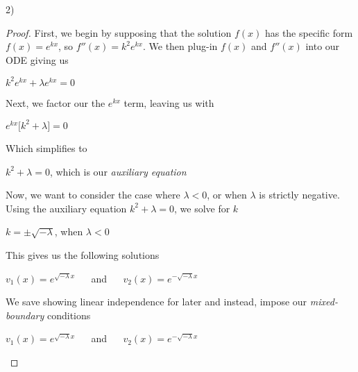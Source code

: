 \documentclass[executivepaper]{article}
\begin{document}
\begin{flushleft}

2) 
\begin{proof}

First, we begin by supposing that the solution $f(x)$ has the specific form $f(x)=e^{kx}$, so $f''(x)=k^2e^{kx}$. We then plug-in $f(x)$ and $f''(x)$ into our ODE giving us

\begin{center}

$k^2e^{kx}+\lambda e^{kx}=0$

\end{center}

Next, we factor our the $e^{kx}$ term, leaving us with

\begin{center}

$e^{kx}\bigg[k^2+\lambda \bigg]=0$

\end{center}

Which simplifies to

\begin{center}

$k^2+\lambda=0$, which is our \textit{auxiliary equation}

\end{center}

Now, we want to consider the case where $\lambda < 0$, or when $\lambda$ is strictly negative. Using the auxiliary equation $k^2+\lambda=0$, we solve for $k$

\begin{center}

$k=\pm \sqrt{-\lambda}$, when $\lambda < 0$

\end{center}

This gives us the following solutions

\begin{center}

$v_{1}(x)=e^{\sqrt{-\lambda} x}$ $\quad$ and $\quad$ $v_{2}(x)=e^{-\sqrt{-\lambda} x}$

\end{center}

We save showing linear independence for later and instead, impose our \textit{mixed-boundary} conditions

\begin{center}

$v_{1}(x)=e^{\sqrt{-\lambda} x}$ $\quad$ and $\quad$ $v_{2}(x)=e^{-\sqrt{-\lambda} x}$


\end{center}
\end{proof}
\end{flushleft}
\end{document}
